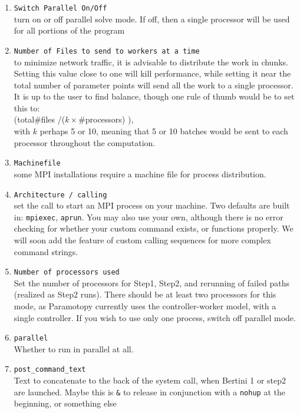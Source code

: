 \begin{enumerate}
	\item \texttt{Switch Parallel On/Off}  \\turn on or off parallel solve mode.  If off, then a single processor will be used for all portions of the program
	
	\item \texttt{Number of Files to send to workers at a time}\\ to minimize network traffic, it is advisable to distribute the work in chunks.  Setting this value close to one will kill performance, while setting it near the total number of parameter points will send all the work to a single processor.  It is up to the user to find balance, though one rule of thumb would be to set this to:   \\ \hspace{2in} (total\#files /($k \times $\#processors) ), \\with $k$ perhaps 5 or 10, meaning that 5 or 10 batches would be sent to each processor throughout the computation.
	
	\item \texttt{Machinefile} \\ some MPI installations require a machine file for process distribution.
	
	\item \texttt{Architecture / calling} \\ set the call to start an MPI process on your machine.  Two defaults are built in: \texttt{mpiexec}, \texttt{aprun}.  You may also use your own, although there is no error checking for whether your custom command exists, or functions properly.  We will soon add the feature of custom calling sequences for more complex command strings.
	
	\item \texttt{Number of processors used} \\ Set the number of processors for Step1, Step2, and rerunning of failed paths (realized as Step2 runs).  There should be at least two processors for this mode, as Paramotopy currently uses the controller-worker model, with a single controller.  If you wish to use only one process, switch off parallel mode.  
	
	\item \verb|parallel| \\ Whether to run in parallel at all.  

	\item \verb|post_command_text| \\ Text to concatenate to the back of the system call, when Bertini 1 or step2 are launched.  Maybe this is \verb|&| to release in conjunction with a \verb|nohup| at the beginning, or something else


\end{enumerate}
